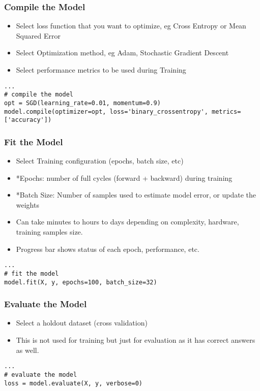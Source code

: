 \begin{frame}[fragile] \frametitle{Compile the Model}

\begin{itemize}
\item Select loss function that you want to optimize, eg Cross Entropy or Mean Squared Error
\item Select Optimization method, eg Adam, Stochastic Gradient Descent
\item Select performance metrics to be used during Training
\end{itemize}

\begin{lstlisting}
...
# compile the model
opt = SGD(learning_rate=0.01, momentum=0.9)
model.compile(optimizer=opt, loss='binary_crossentropy', metrics=['accuracy'])
\end{lstlisting}
\end{frame}

\begin{frame}[fragile] \frametitle{Fit the Model}

\begin{itemize}
\item Select Training configuration (epochs, batch size, etc)
\item *Epochs: number of full cycles (forward + backward) during training
\item *Batch Size: Number of samples used to estimate model error, or update the weights
\item Can take minutes to hours to days depending on complexity, hardware, training samples size.
\item Progress bar shows status of each epoch, performance, etc.
\end{itemize}

\begin{lstlisting}
...
# fit the model
model.fit(X, y, epochs=100, batch_size=32)
\end{lstlisting}
\end{frame}

\begin{frame}[fragile] \frametitle{Evaluate the Model}

\begin{itemize}
\item Select a holdout dataset (cross validation)
\item This is not used for training but just for evaluation as it has correct answers as well.
\end{itemize}

\begin{lstlisting}
...
# evaluate the model
loss = model.evaluate(X, y, verbose=0)
\end{lstlisting}
\end{frame}


